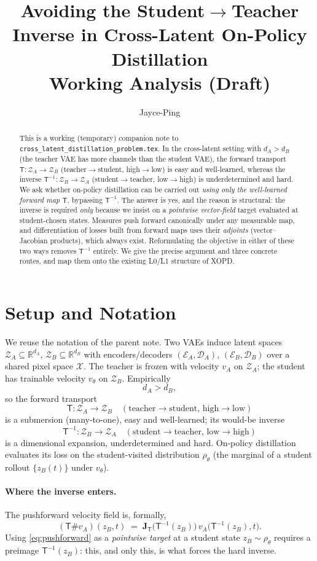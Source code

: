 \documentclass[11pt,a4paper]{article}
\title{\textbf{Avoiding the Student$\to$Teacher Inverse in Cross-Latent On-Policy Distillation}\\[0.3em]
\large Working Analysis (Draft)}
\author{Jayce-Ping}
\date{}
\newcommand{\R}{\mathbb{R}}
\newcommand{\Xspace}{\mathcal{X}}
\newcommand{\Za}{\mathcal{Z}_{A}}
\newcommand{\Zb}{\mathcal{Z}_{B}}
\newcommand{\Enc}{\mathcal{E}}
\newcommand{\Dec}{\mathcal{D}}
\newcommand{\Tmap}{\mathsf{T}}
\newcommand{\Tinv}{\mathsf{T}^{-1}}
\newcommand{\push}{\#}
\newcommand{\Jac}{\mathbf{J}}
\theoremstyle{definition}
\begin{document}
\maketitle

\begin{abstract}
This is a working (temporary) companion note to
\texttt{cross\_latent\_distillation\_problem.tex}. In the cross-latent setting with
$d_A>d_B$ (the teacher VAE has more channels than the student VAE), the forward transport
$\Tmap:\Za\to\Zb$ (teacher$\to$student, high$\to$low) is easy and well-learned, whereas the
inverse $\Tinv:\Zb\to\Za$ (student$\to$teacher, low$\to$high) is underdetermined and hard.
We ask whether on-policy distillation can be carried out \emph{using only the well-learned
forward map $\Tmap$}, bypassing $\Tinv$. The answer is yes, and the reason is structural:
the inverse is required \emph{only} because we insist on a \emph{pointwise vector-field}
target evaluated at student-chosen states. Measures push forward canonically under any
measurable map, and differentiation of losses built from forward maps uses their
\emph{adjoints} (vector--Jacobian products), which always exist. Reformulating the objective
in either of these two ways removes $\Tinv$ entirely. We give the precise argument and three
concrete routes, and map them onto the existing L0/L1 structure of XOPD.
\end{abstract}

\section{Setup and Notation}
\label{sec:setup}

We reuse the notation of the parent note. Two VAEs induce latent spaces
$\Za\subseteq\R^{d_A}$, $\Zb\subseteq\R^{d_B}$ with encoders/decoders
$(\Enc_A,\Dec_A)$, $(\Enc_B,\Dec_B)$ over a shared pixel space $\Xspace$. The teacher is
frozen with velocity $v_A$ on $\Za$; the student has trainable velocity $v_\theta$ on $\Zb$.
Empirically
\[
d_A > d_B ,
\]
so the forward transport
\[
\Tmap:\Za\to\Zb\quad(\text{teacher}\to\text{student, high}\to\text{low})
\]
is a submersion (many-to-one), easy and well-learned; its would-be inverse
\[
\Tinv:\Zb\to\Za\quad(\text{student}\to\text{teacher, low}\to\text{high})
\]
is a dimensional expansion, underdetermined and hard. On-policy distillation evaluates its
loss on the student-visited distribution $\rho_\theta$ (the marginal of a student rollout
$\{z_B(t)\}$ under $v_\theta$).

\paragraph{Where the inverse enters.}
The pushforward velocity field is, formally,
\begin{equation}
(\Tmap\push v_A)(z_B,t)
\;=\;
\Jac_{\Tmap}\!\big(\Tinv(z_B)\big)\,v_A\!\big(\Tinv(z_B),t\big).
\label{eq:pushforward}
\end{equation}
Using \eqref{eq:pushforward} as a \emph{pointwise target} at a student state $z_B\sim\rho_\theta$
requires a preimage $\Tinv(z_B)$: this, and only this, is what forces the hard inverse.
\end{document}

